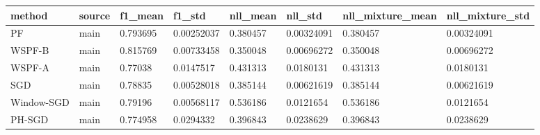 \begin{tabular}{llllllll}
\hline
method & source & f1\_mean & f1\_std & nll\_mean & nll\_std & nll\_mixture\_mean & nll\_mixture\_std \\
\hline
PF & main & 0.793695 & 0.00252037 & 0.380457 & 0.00324091 & 0.380457 & 0.00324091 \\
WSPF-B & main & 0.815769 & 0.00733458 & 0.350048 & 0.00696272 & 0.350048 & 0.00696272 \\
WSPF-A & main & 0.77038 & 0.0147517 & 0.431313 & 0.0180131 & 0.431313 & 0.0180131 \\
SGD & main & 0.78835 & 0.00528018 & 0.385144 & 0.00621619 & 0.385144 & 0.00621619 \\
Window-SGD & main & 0.79196 & 0.00568117 & 0.536186 & 0.0121654 & 0.536186 & 0.0121654 \\
PH-SGD & main & 0.774958 & 0.0294332 & 0.396843 & 0.0238629 & 0.396843 & 0.0238629 \\
\hline
\end{tabular}
